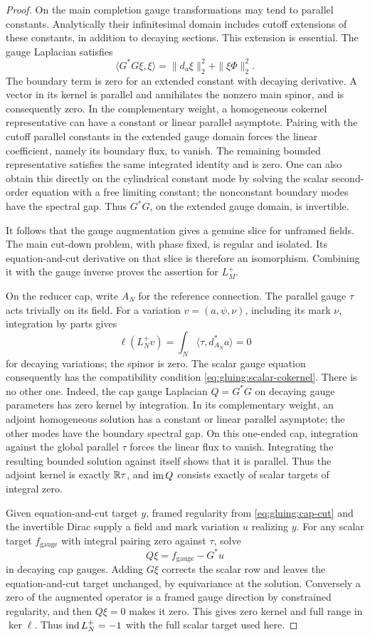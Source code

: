\begin{proof}
On the main completion gauge transformations may tend to parallel
constants.  Analytically their infinitesimal domain includes cutoff
extensions of these constants, in addition to decaying sections.
This extension is essential.  The gauge Laplacian satisfies
\[
 \langle G^*G\xi,\xi\rangle
 =\|d_a\xi\|_2^2+\|\xi\Phi\|_2^2.
\]
The boundary term is zero for an extended constant with decaying
derivative.  A vector in its kernel is parallel and annihilates the
nonzero main spinor, and is consequently zero.  In the complementary
weight, a homogeneous cokernel representative can have a constant
or linear parallel asymptote.  Pairing with the cutoff parallel
constants in the extended gauge domain forces the linear
coefficient, namely its boundary flux, to vanish.  The remaining
bounded representative satisfies the same integrated identity
and is zero.  One can
also obtain this directly on the cylindrical constant mode by
solving the scalar second-order equation with a free limiting
constant; the nonconstant boundary modes have the spectral gap.
Thus $G^*G$, on the extended gauge domain, is invertible.

It follows that the gauge augmentation gives a genuine slice for
unframed fields.  The main cut-down problem, with phase fixed, is
regular and isolated.  Its equation-and-cut derivative on that slice
is therefore an isomorphism.  Combining it with the gauge inverse
proves the assertion for $L_M^+$.

On the reducer cap, write $A_N$ for the reference connection.
The parallel gauge $\tau$ acts trivially on its field.  For a
variation $v=(a,\psi,\nu)$, including its mark $\nu$, integration
by parts gives
\[
 \ell(L_N^+v)=\int_N\langle\tau,d_{A_N}^*a\rangle=0
\]
for decaying variations; the spinor is zero.  The scalar gauge
equation consequently has the compatibility condition
\eqref{eq:gluing:scalar-cokernel}.  There is no other one.
Indeed, the cap gauge Laplacian $Q=G^*G$ on decaying gauge
parameters has zero kernel by integration.  In its complementary
weight, an adjoint homogeneous solution has a constant or linear
parallel asymptote; the other modes have the boundary spectral
gap.  On this one-ended cap, integration against the global
parallel $\tau$ forces the linear flux to vanish.  Integrating
the resulting bounded solution against itself shows that it is
parallel.  Thus the adjoint kernel is exactly $\mathbb R\tau$, and
$\operatorname{im} Q$ consists exactly of scalar targets of integral zero.

Given equation-and-cut target $y$, framed regularity from
\eqref{eq:gluing:cap-cut} and the invertible Dirac supply a field
and mark variation $u$ realizing $y$.  For any scalar target
$f_{\mathrm{gauge}}$ with integral pairing zero against $\tau$,
solve
\[
 Q\xi=f_{\mathrm{gauge}}-G^*u
\]
in decaying cap gauges.  Adding $G\xi$ corrects the scalar row
and leaves the equation-and-cut target unchanged, by equivariance
at the solution.  Conversely a zero of the augmented operator is
a framed gauge direction by constrained regularity, and then
$Q\xi=0$ makes it zero.  This gives zero kernel and full range
in $\ker\ell$.  Thus
$\operatorname{ind} L_N^+=-1$ with the full scalar target used here.


\end{proof}
